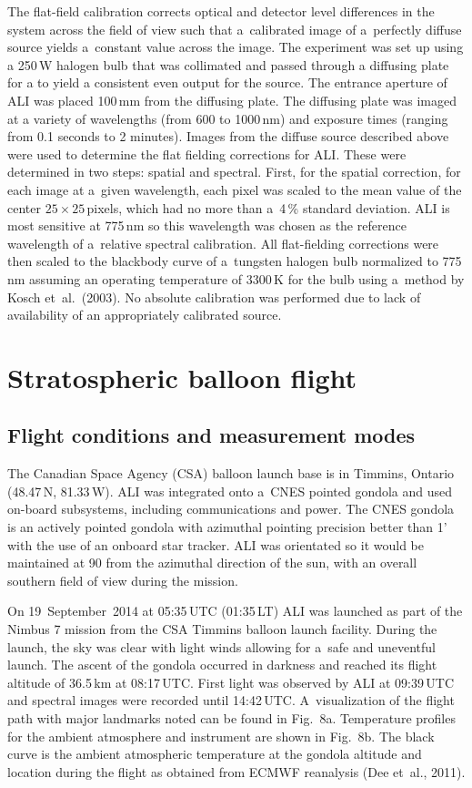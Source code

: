 \documentclass[amtd, online, hvmath]{copernicus}
\begin{document}
The flat-field calibration corrects optical and detector level
differences in the system across the field of view such that
a~calibrated image of a~perfectly diffuse source yields a~constant
value across the image. The experiment was set up using a 250\,W halogen bulb that was collimated and passed through a diffusing plate for a to yield a consistent even output for the source. The entrance aperture of ALI was placed 100\,mm from the diffusing plate. The diffusing plate was imaged at a variety of wavelengths (from 600 to 1000\,nm) and exposure times (ranging from 0.1 seconds to 2 minutes). Images from the diffuse source
described above were used to determine the flat fielding corrections
for ALI. These were determined in two steps: spatial and
spectral. First, for the spatial correction, for each image at a~given
wavelength, each pixel was scaled to the mean value of the center
$25\times 25$\,pixels, which had no more than a~4\,{\%} standard
deviation. ALI is most sensitive at 775\,\unit{nm} so this wavelength
was chosen as the reference wavelength of a~relative spectral
calibration. All flat-fielding corrections were then scaled to the
blackbody curve of a~tungsten halogen bulb normalized to
775\,\unit{nm} assuming an operating temperature of 3300\,\unit{K} for
the bulb using a~method by Kosch et~al.~(2003). No absolute
calibration was performed due to lack of availability of an
appropriately calibrated source.

\section{Stratospheric balloon flight}
\subsection{Flight conditions and measurement modes}

The Canadian Space Agency (CSA) balloon launch base is in Timmins,
Ontario (48.47{\degree}\,N, 81.33{\degree}\,W). ALI was integrated
onto a~CNES pointed gondola and used on-board subsystems, including
communications and power. The CNES gondola is an actively pointed
gondola with azimuthal pointing precision better than 1' with the use
of an onboard star tracker. ALI was orientated so it would be
maintained at 90{\degree} from the azimuthal direction of the sun,
with an overall southern field of view during the mission.

On 19~September~2014 at 05:35\,UTC (01:35\,LT) ALI was launched as
part of the Nimbus 7 mission from the CSA Timmins balloon launch
facility.  During the launch, the sky was clear with light winds
allowing for a~safe and uneventful launch. The ascent of the gondola
occurred in darkness and reached its flight altitude of
36.5\,\unit{km} at 08:17\,UTC. First light was observed by ALI at
09:39\,UTC and spectral images were recorded until 14:42\,UTC.
A~visualization of the flight path with major landmarks noted can be
found in Fig.~8a. Temperature profiles for the ambient atmosphere and
instrument are shown in Fig.~8b. The black curve is the ambient
atmospheric temperature at the gondola altitude and location during
the flight as obtained from ECMWF reanalysis (Dee et~al., 2011).
\end{document}
